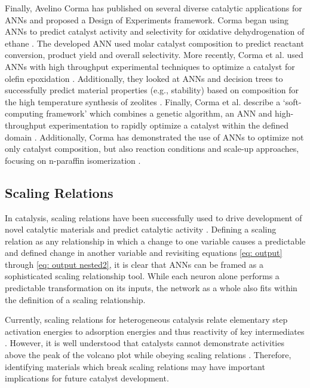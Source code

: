 	Finally, Avelino Corma has published on several diverse catalytic applications for ANNs and proposed a Design of Experiments framework. Corma began using ANNs to predict catalyst activity and selectivity for oxidative dehydrogenation of ethane \cite{Corma_2002}. The developed ANN used molar catalyst composition to predict reactant conversion, product yield and overall selectivity. More recently, Corma  et al. used ANNs with high throughput experimental techniques to optimize a  catalyst for olefin epoxidation \cite{Corma_2005}. Additionally, they looked at ANNs and decision trees to successfully predict material properties (e.g., stability) based on composition for the high temperature synthesis of zeolites \cite{Corma_2006}. Finally, Corma et al. describe a `soft-computing framework' which combines a genetic algorithm, an ANN and high-throughput experimentation to rapidly optimize a catalyst within the defined domain \cite{Corma_2008}. Additionally, Corma has demonstrated the use of ANNs to optimize not only catalyst composition, but also reaction conditions and scale-up approaches, focusing on n-paraffin isomerization \cite{Corma_2003_1,Corma_2003_2}. 

	\subsection{Scaling Relations}

	In catalysis, scaling relations have been successfully used to drive development of novel catalytic materials and predict catalytic activity \cite{Greeley_2016}. Defining a scaling relation as any relationship in which a change to one variable causes a predictable and defined change in another variable and revisiting equations \ref{eq: output} through \ref{eq: output nested2}, it is clear that ANNs can be framed as a sophisticated scaling relationship tool. While each neuron alone performs a predictable transformation on its inputs, the network as a whole also fits within the definition of a scaling relationship. 

	Currently, scaling relations for heterogeneous catalysis relate elementary step activation energies to adsorption energies and thus reactivity of key intermediates \cite{Gani_2017}. However, it is well understood that catalysts cannot demonstrate activities above the peak of the volcano plot while obeying scaling relations \cite{Andersen_2017}. Therefore, identifying materials which break scaling relations may have important implications for future catalyst development. 
	
